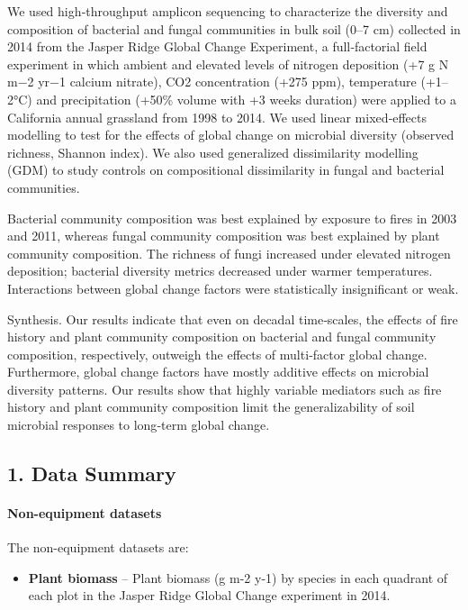 \documentclass[
  english,
]{article}
\providecommand{\tightlist}{%
  \setlength{\itemsep}{0pt}\setlength{\parskip}{0pt}}
\begin{document}
We used high‐throughput amplicon sequencing to characterize the
diversity and composition of bacterial and fungal communities in bulk
soil (0--7 cm) collected in 2014 from the Jasper Ridge Global Change
Experiment, a full‐factorial field experiment in which ambient and
elevated levels of nitrogen deposition (+7 g N m−2 yr−1 calcium
nitrate), CO2 concentration (+275 ppm), temperature (+1--2°C) and
precipitation (+50\% volume with +3 weeks duration) were applied to a
California annual grassland from 1998 to 2014. We used linear
mixed‐effects modelling to test for the effects of global change on
microbial diversity (observed richness, Shannon index). We also used
generalized dissimilarity modelling (GDM) to study controls on
compositional dissimilarity in fungal and bacterial communities.

Bacterial community composition was best explained by exposure to fires
in 2003 and 2011, whereas fungal community composition was best
explained by plant community composition. The richness of fungi
increased under elevated nitrogen deposition; bacterial diversity
metrics decreased under warmer temperatures. Interactions between global
change factors were statistically insignificant or weak.

Synthesis. Our results indicate that even on decadal time‐scales, the
effects of fire history and plant community composition on bacterial and
fungal community composition, respectively, outweigh the effects of
multi‐factor global change. Furthermore, global change factors have
mostly additive effects on microbial diversity patterns. Our results
show that highly variable mediators such as fire history and plant
community composition limit the generalizability of soil microbial
responses to long‐term global change.

\hypertarget{dmp-content}{}
\hypertarget{sec-data-summary}{}
\hypertarget{data-summary}{%
\subsection{1. Data Summary}\label{data-summary}}

\hypertarget{q-data-summary}{}
\hypertarget{non-equipment-datasets}{%
\paragraph{Non-equipment datasets}\label{non-equipment-datasets}}

The non-equipment datasets are:

\begin{itemize}
\tightlist
\item
  \textbf{Plant biomass} {--} Plant biomass (g m-2 y-1) by species in
  each quadrant of each plot in the Jasper Ridge Global Change
  experiment in 2014.
\end{itemize}
\end{document}
